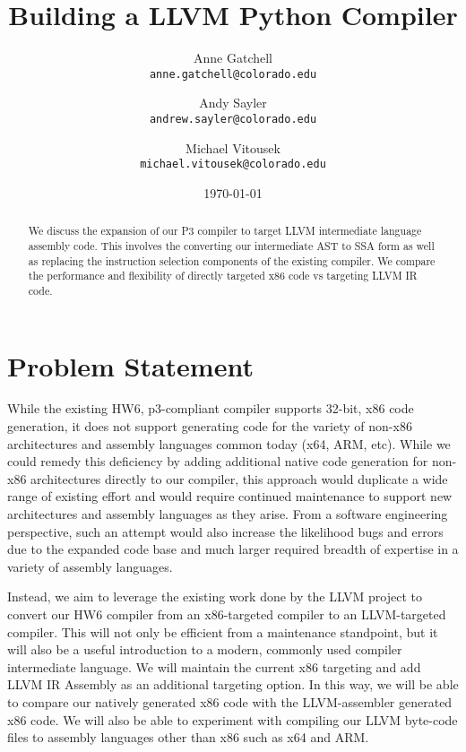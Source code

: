 \documentclass[11pt,twocolumn]{article}
\begin{document}
\title{
  Building a LLVM Python Compiler
}

\author{
  Anne Gatchell    \\ \texttt{anne.gatchell@colorado.edu} \and
  Andy Sayler      \\ \texttt{andrew.sayler@colorado.edu} \and
  Michael Vitousek \\ \texttt{michael.vitousek@colorado.edu}
}

\date{\today}

\maketitle

\begin{abstract}

We discuss the expansion of our P3 compiler to target LLVM intermediate
language assembly code. This involves the converting our intermediate
AST to SSA form as well as replacing the instruction selection
components of the existing compiler. We compare the performance and
flexibility of directly targeted x86 code vs targeting LLVM IR code.

\end{abstract}

\section{Problem Statement}

While the existing HW6, p3-compliant compiler supports 32-bit, x86
code generation, it does not support generating code for the variety
of non-x86 architectures and assembly languages common today (x64,
ARM, etc). While we could remedy this deficiency by adding additional
native code generation for non-x86 architectures directly to our
compiler, this approach would duplicate a wide range of existing
effort and would require continued maintenance to support new
architectures and assembly languages as they arise. From a software
engineering perspective, such an attempt would also increase the
likelihood bugs and errors due to the expanded code base and much
larger required breadth of expertise in a variety of assembly
languages.

Instead, we aim to leverage the existing work done by the LLVM project
\cite{llvm.org} to convert our HW6 compiler from an x86-targeted
compiler to an LLVM-targeted compiler. This will not only be efficient
from a maintenance standpoint, but it will also be a useful
introduction to a modern, commonly used compiler intermediate
language. We will maintain the current x86 targeting and add LLVM IR
Assembly \cite{lattner-llvmlangref} as an additional targeting
option. In this way, we will be able to compare our natively generated
x86 code with the LLVM-assembler generated x86 code. We will also be
able to experiment with compiling our LLVM byte-code files to assembly
languages other than x86 such as x64 and ARM.
\end{document}
